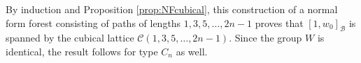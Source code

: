 \documentclass[11pt]{amsart}
\theoremstyle{plain}
\theoremstyle{definition}
\newcommand{\cC}{\mathcal{C}}
\newcommand{\cB}{\mathcal B}
\numberwithin{equation}{subsection}
\begin{document}
By induction and Proposition \ref{prop:NFcubical}, this construction of a normal form forest consisting of paths of lengths $1, 3, 5, \dots, 2n-1$ proves that  $[1,w_0]_\cB$ is spanned by the cubical lattice $\cC(1, 3, 5, \dots, 2n-1)$. Since the group $W$ is identical, the result follows for type $C_n$ as well.







%


\end{document}
